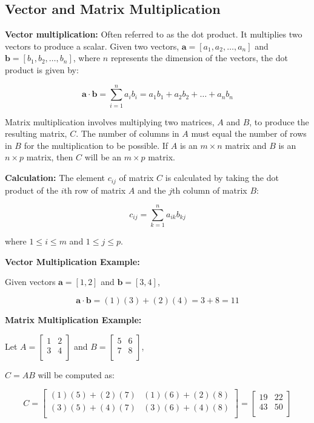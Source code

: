 \documentclass[12pt, twoside,hidelinks]{article}
\theoremstyle{definition}
\numberwithin{equation}{section}
\begin{document}
\subsection{Vector and Matrix Multiplication}

\textbf{Vector multiplication:} Often referred to as the dot product. It multiplies two vectors to produce a scalar. Given two vectors, $\mathbf{a} = [a_1, a_2, \ldots, a_n]$ and $\mathbf{b} = [b_1, b_2, \ldots, b_n]$, where $n$ represents the dimension of the vectors, the dot product is given by:

\[
\mathbf{a} \cdot \mathbf{b} = \sum_{i=1}^{n} a_i b_i = a_1b_1 + a_2b_2 + \ldots + a_nb_n
\]


Matrix multiplication involves multiplying two matrices, $A$ and $B$, to produce the resulting matrix, $C$. The number of columns in $A$ must equal the number of rows in $B$ for the multiplication to be possible. If $A$ is an $m \times n$ matrix and $B$ is an $n \times p$ matrix, then $C$ will be an $m \times p$ matrix.

\textbf{Calculation:} The element $c_{ij}$ of matrix $C$ is calculated by taking the dot product of the $i$th row of matrix $A$ and the $j$th column of matrix $B$:

\[
c_{ij} = \sum_{k=1}^{n} a_{ik} b_{kj}
\]

where $1 \leq i \leq m$ and $1 \leq j \leq p$.

\textbf{Vector Multiplication Example:}

Given vectors $\mathbf{a} = [1, 2]$ and $\mathbf{b} = [3, 4]$,

\[
\mathbf{a} \cdot \mathbf{b} = (1)(3) + (2)(4) = 3 + 8 = 11
\]

\textbf{Matrix Multiplication Example:}

Let $A = \left[ \begin{array}{cc}
1 & 2 \\
3 & 4 \\
\end{array} \right]$ and $B = \left[ \begin{array}{cc}
5 & 6 \\
7 & 8 \\
\end{array} \right]$,

$C = AB$ will be computed as:

\[
C = \left[ \begin{array}{cc}
(1)(5)+(2)(7) & (1)(6)+(2)(8) \\
(3)(5)+(4)(7) & (3)(6)+(4)(8) \\
\end{array} \right] = \left[ \begin{array}{cc}
19 & 22 \\
43 & 50 \\
\end{array} \right]
\]
\end{document}
